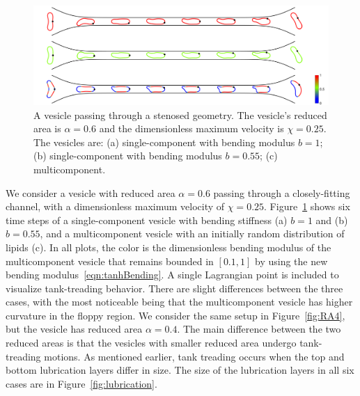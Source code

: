 \documentclass[twoside,twocolumn,9pt]{article}
\newcommand{\subfigimg}[3][,]{%
  \setbox1=\hbox{\texttt{[image: \#3]}}%
  \leavevmode\rlap{\usebox1}%
  \rlap{\hspace*{0pt}\raisebox{\dimexpr\ht1-0\baselineskip}{\bf
  \normalsize #2}}%
  \phantom{\usebox1}%
}
\begin{document}
\begin{figure}[b]
  \centering
  \includegraphics[width=0.9\linewidth]{figures/STENOSIS_RAp6MCp5.pdf}
  \caption{\label{fig:RA6} \small A vesicle passing through a stenosed
  geometry. The vesicle's reduced area is $\alpha = 0.6$ and the
  dimensionless maximum velocity is $\chi = 0.25$. The vesicles are: (a)
  single-component with bending modulus $b=1$; (b) single-component with
  bending modulus $b=0.55$; (c) multicomponent.}
\end{figure}


We consider a vesicle with reduced area $\alpha = 0.6$ passing through a
closely-fitting channel, with a dimensionless maximum velocity of $\chi
= 0.25$. Figure~\ref{fig:RA6} shows six time steps of a single-component
vesicle with bending stiffness (a) $b=1$ and (b) $b=0.55$, and a
multicomponent vesicle with an initially random distribution of lipids
(c). In all plots, the color is the dimensionless bending modulus of the
multicomponent vesicle that remains bounded in $[0.1,1]$ by using the
new bending modulus~\eqref{eqn:tanhBending}. A single Lagrangian point
is included to visualize tank-treading behavior. There are slight
differences between the three cases, with the most noticeable being that
the multicomponent vesicle has higher curvature in the floppy region. We
consider the same setup in Figure~\ref{fig:RA4}, but the vesicle has
reduced area $\alpha = 0.4$. The main difference between the two reduced
areas is that the vesicles with smaller reduced area undergo
tank-treading motions. As mentioned earlier, tank treading occurs when
the top and bottom lubrication layers differ in size. The size of the
lubrication layers in all six cases are in Figure~\ref{fig:lubrication}. 
\end{document}
